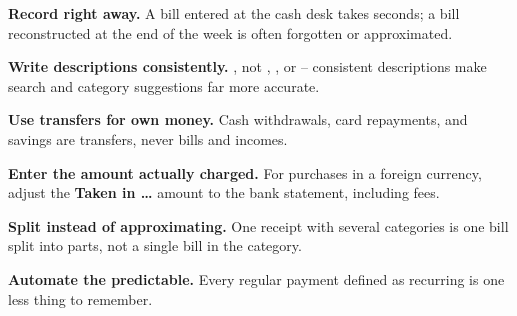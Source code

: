 \textbf{Record right away.} A bill entered at the cash desk takes seconds; a bill
reconstructed at the end of the week is often forgotten or approximated.

\textbf{Write descriptions consistently.} , not , , or
 -- consistent descriptions make search and category suggestions
far more accurate.

\textbf{Use transfers for own money.} Cash withdrawals, card repayments, and savings are
transfers, never bills and incomes.

\textbf{Enter the amount actually charged.} For purchases in a foreign currency, adjust the
\textbf{Taken in \dots} amount to the bank statement, including fees.

\textbf{Split instead of approximating.} One receipt with several categories is one bill
split into parts, not a single bill in the  category.

\textbf{Automate the predictable.} Every regular payment defined as recurring is one less
thing to remember.
